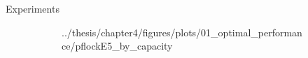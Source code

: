 \documentclass{beamer}
\begin{document}
\begin{frame}{Experiments}
\begin{figure}
\begin{subfigure}[t]{0.32\textwidth}
{                {../thesis/chapter4/figures/plots/01_optimal_performance/pflockE5_by_capacity}}
            \end{subfigure}
            \hfill
            \begin{subfigure}[t]{0.32\textwidth}
            \end{subfigure}
            \begin{subfigure}[t]{0.32\textwidth}
            \end{subfigure}
            \begin{subfigure}[t]{0.32\textwidth}

\end{subfigure}
\end{figure}
\end{frame}
\end{document}
